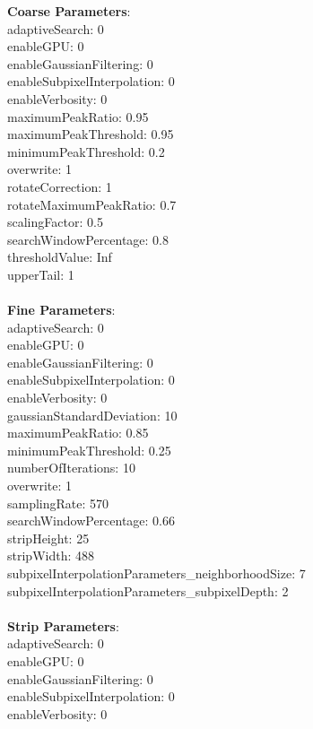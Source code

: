 \documentclass[11pt]{article}
\begin{document}
\textbf{Coarse Parameters}: \\
adaptiveSearch: 0\\
enableGPU: 0\\
enableGaussianFiltering: 0\\
enableSubpixelInterpolation: 0\\
enableVerbosity: 0\\
maximumPeakRatio: 0.95\\
maximumPeakThreshold: 0.95\\
minimumPeakThreshold: 0.2\\
overwrite: 1\\
rotateCorrection: 1\\
rotateMaximumPeakRatio: 0.7\\
scalingFactor: 0.5\\
searchWindowPercentage: 0.8\\
thresholdValue: Inf\\
upperTail: 1\\
\\
\textbf{Fine Parameters}: \\
adaptiveSearch: 0\\
enableGPU: 0\\
enableGaussianFiltering: 0\\
enableSubpixelInterpolation: 0\\
enableVerbosity: 0\\
gaussianStandardDeviation: 10\\
maximumPeakRatio: 0.85\\
minimumPeakThreshold: 0.25\\
numberOfIterations: 10\\
overwrite: 1\\
samplingRate: 570\\
searchWindowPercentage: 0.66\\
stripHeight: 25\\
stripWidth: 488\\
subpixelInterpolationParameters\_neighborhoodSize: 7\\
subpixelInterpolationParameters\_subpixelDepth: 2\\
\\
\textbf{Strip Parameters}: \\
adaptiveSearch: 0\\
enableGPU: 0\\
enableGaussianFiltering: 0\\
enableSubpixelInterpolation: 0\\
enableVerbosity: 0\\
\end{document}
